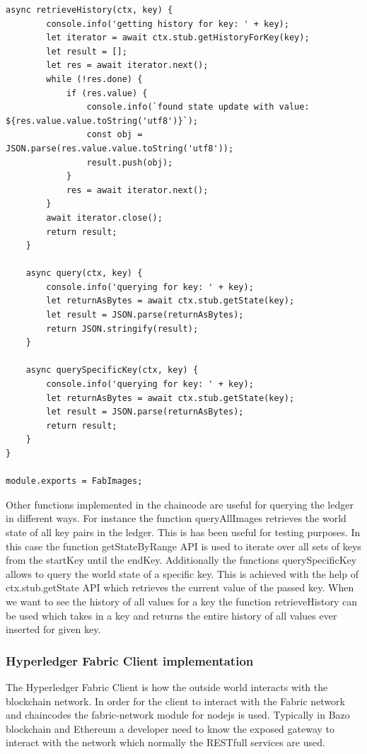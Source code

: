 \begin{lstlisting}[caption={Chaincode for interacting with the network.},label=chaincode, captionpos=b]
    async retrieveHistory(ctx, key) {
        console.info('getting history for key: ' + key);
        let iterator = await ctx.stub.getHistoryForKey(key);
        let result = [];
        let res = await iterator.next();
        while (!res.done) {
            if (res.value) {
                console.info(`found state update with value: ${res.value.value.toString('utf8')}`);
                const obj = JSON.parse(res.value.value.toString('utf8'));
                result.push(obj);
            }
            res = await iterator.next();
        }
        await iterator.close();
        return result;
    }

    async query(ctx, key) {
        console.info('querying for key: ' + key);
        let returnAsBytes = await ctx.stub.getState(key);
        let result = JSON.parse(returnAsBytes);
        return JSON.stringify(result);
    }

    async querySpecificKey(ctx, key) {
        console.info('querying for key: ' + key);
        let returnAsBytes = await ctx.stub.getState(key);
        let result = JSON.parse(returnAsBytes);
        return result;
    }
}

module.exports = FabImages;

\end{lstlisting}


Other functions implemented in the chaincode are useful for querying the ledger in different ways. For instance the function {\selectfont queryAllImages}  retrieves the world state of all key pairs in the ledger. This is has been useful for testing purposes. In this case the function {\selectfont getStateByRange} API is used to iterate over all sets of keys from the startKey until the endKey. 
Additionally the functions {\selectfont querySpecificKey} allows to query the world state of a specific key. This is achieved with the help of {\selectfont ctx.stub.getState} API which retrieves the current value of the passed key. When we want to see the history of all values for a key the function {\selectfont retrieveHistory} can be used which takes in a key and returns the entire history of all values ever inserted for given key. 

\subsubsection{Hyperledger Fabric Client implementation}
The Hyperledger Fabric Client is how the outside world interacts with the blockchain network. In order for the client to interact with the Fabric network and chaincodes the {\selectfont fabric-network} module for nodejs is used. Typically in Bazo blockchain and Ethereum a developer need to know the exposed gateway to interact with the network which normally the RESTfull services are used. 

